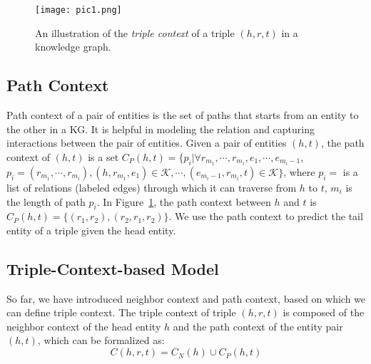 \begin{figure}
  \texttt{[image: pic1.png]}
  \caption{An illustration of the \emph{triple context} of a triple $(h,r,t)$ in a knowledge graph.}
  \label{pic1}
\end{figure}


\subsection{Path Context}
Path context of a pair of entities is the set of paths that starts from an entity to the other in a KG. It is helpful in modeling the relation and capturing interactions between the pair of entities. Given a pair of entities $(h,t)$, the path context of $(h,t)$ is a set $C_P(h,t)=\{p_i | \forall r_{m_1}, \cdots, r_{m_i}, e_1, \cdots, e_{m_i-1},$ $p_i=(r_{m_1}, \cdots, r_{m_i}), (h,r_{m_1},e_1)\in\mathcal{K}, \cdots, (e_{m_i-1}, r_{m_i}, t)\in\mathcal{K}\}$, where $p_i=$ is a list of relations (labeled edges) through which it can traverse from $h$ to $t$, $m_i$ is the length of path $p_i$. In Figure~\ref{pic1}, the path context between $h$ and $t$ is $C_P(h,t) = \{(r_1, r_2), (r_2, r_1, r_2)\}$. We use the path context to predict the tail entity of a triple given the head entity.


\subsection{Triple-Context-based Model}
\begin{comment}
In general, a KG embedding model defines a score function for evaluating the confidence of a triple, and optimize an objective function constructed from the score function. For example, TransE wants $\bm{\mathrm{h}} + \bm{\mathrm{r}} \approx \bm{\mathrm{t}}$ when $(h,r,t)$ holds, so it defines the score function as
\begin{equation}\label{TransE_score_function}
  f(h,r,t)=\|\bm{\mathrm{h}} + \bm{\mathrm{r}} -\bm{\mathrm{t}}\|
\end{equation}
which is negative correlation with the confidence of a triple. It could be either the $L_1$ or the $L_2$ norm.\end{comment}
So far, we have introduced neighbor context and path context, based on which we can define triple context. The triple context of triple $(h,r,t)$ is composed of the neighbor context of the head entity $h$ and the path context of the entity pair $(h,t)$, which can be formalized as:
\begin{equation}\label{triple context}
  C(h,r,t) = C_N(h) \cup C_P(h, t)
\end{equation}

